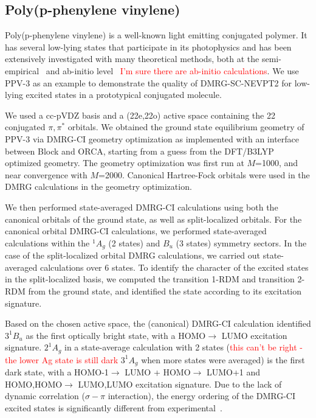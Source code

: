 \subsection{Poly(p-phenylene vinylene)}

Poly(p-phenylene vinylene) is a well-known light emitting conjugated polymer. It has several low-lying states that participate in its photophysics 
and has been extensively investigated with many theoretical methods, both at the semi-empirical~\cite{shukla_correlated_2002,bursill_symmetry-adapted_2009,beljonne_theoretical_1995} and ab-initio level~\cite{xxx} \textcolor{red}{I'm sure there are ab-initio calculations}. 
We use PPV-3 as an example to demonstrate the quality of DMRG-SC-NEVPT2 for low-lying excited states in a prototypical conjugated molecule.

We used a cc-pVDZ basis and a (22e,22o) active space containing the 22 conjugated $\pi, \pi^*$ orbitals. We obtained the ground state equilibrium geometry of PPV-3 via DMRG-CI geometry optimization\cite{hu_excited-state_2015} as implemented with an interface between Block and ORCA\cite{neese_orca_2012}, starting from a guess from the DFT/B3LYP optimized geometry. The geometry optimization was first run at $M$=1000, and near convergence with $M$=2000. Canonical Hartree-Fock orbitals were used 
in the DMRG calculations in the geometry optimization.

We then performed state-averaged DMRG-CI calculations using both the canonical orbitals of the ground state, as well as split-localized orbitals. For the canonical orbital DMRG-CI calculations, we performed
state-averaged calculations within the $^1A_g$ (2 states) and $B_u$ (3 states) symmetry sectors.
In the case of the split-localized orbital DMRG calculations, we carried out state-averaged calculations over 6 states.
To identify the character of the excited states in the split-localized basis, we computed the transition 1-RDM and transition 2-RDM from the ground state, and 
identified the state according to  its excitation signature.

Based on the chosen active space, the (canonical) DMRG-CI calculation 
identified $3^1B_u$  as the first optically bright state, with a HOMO$\rightarrow$ LUMO excitation signature.  $2^1A_g$ in a state-average calculation 
with 2 states (\textcolor{red}{this can't be right - the lower Ag state is still dark} $3^1A_g$ when more states were averaged) is the first dark state, with a HOMO-1$\rightarrow$ LUMO + HOMO$\rightarrow$ LUMO+1 and HOMO,HOMO$\rightarrow$ LUMO,LUMO excitation signature.
Due to the lack of dynamic correlation ($\sigma-\pi$ interaction), the energy ordering of the DMRG-CI excited states is significantly different 
from experimental~\cite{shukla_correlated_2002,bursill_symmetry-adapted_2009}.

